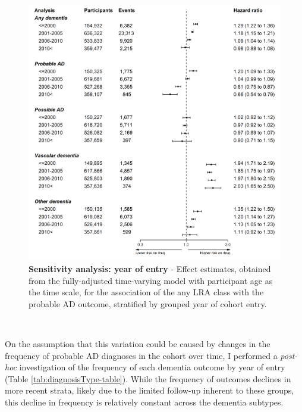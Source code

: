 \documentclass[a4paper, twoside]{templates/ociamthesis}
\begin{document}
\begin{figure}[H]
\includegraphics[width=1\linewidth]{figures/cprd-analysis/forester_cohort_entry} \caption[Sensitivity analysis: year of entry]{\textbf{Sensitivity analysis: year of entry} - Effect estimates, obtained from the fully-adjusted time-varying model with participant age as the time scale, for the association of the any LRA class with the probable AD outcome, stratified by grouped year of cohort entry.}\label{fig:diagnosisTypeFig}
\end{figure}

~

On the assumption that this variation could be caused by changes in the frequency of probable AD diagnoses in the cohort over time, I performed a \emph{post-hoc} investigation of the frequency of each dementia outcome by year of entry (Table \ref{tab:diagnosisType-table}). While the frequency of outcomes declines in more recent strata, likely due to the limited follow-up inherent to these groups, this decline in frequency is relatively constant across the dementia subtypes.

~
\end{document}
